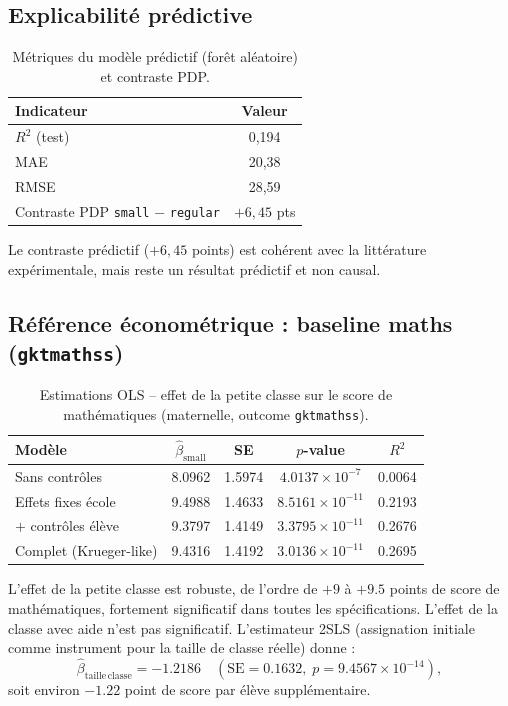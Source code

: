 \documentclass[11pt,a4paper]{article}
\begin{document}
\subsection{Explicabilité prédictive}

\begin{table}[H]
\centering
\caption{Métriques du modèle prédictif (forêt aléatoire) et contraste PDP.}
\label{tab:rf}
\begin{tabular}{lc}
\toprule
Indicateur & Valeur \\
\midrule
$R^2$ (test) & 0{,}194 \\
MAE & 20{,}38 \\
RMSE & 28{,}59 \\
Contraste PDP \texttt{small} $-$ \texttt{regular} & $+6{,}45$ pts \\
\bottomrule
\end{tabular}
\end{table}

Le contraste prédictif ($+6{,}45$ points) est cohérent avec la littérature expérimentale, mais reste un résultat prédictif et non causal.

\subsection{Référence économétrique : baseline maths (\texttt{gktmathss})}

\begin{table}[H]
\centering
\caption{Estimations OLS -- effet de la petite classe sur le score de mathématiques (maternelle, outcome \texttt{gktmathss}).}
\label{tab:ols}
\begin{tabular}{lcccc}
\toprule
Modèle & $\hat\beta_{\mathrm{small}}$ & SE & $p$-value & $R^2$ \\
\midrule
Sans contrôles & 8.0962 & 1.5974 & $4.0137\times10^{-7}$ & 0.0064 \\
Effets fixes école & 9.4988 & 1.4633 & $8.5161\times10^{-11}$ & 0.2193 \\
$+$ contrôles élève & 9.3797 & 1.4149 & $3.3795\times10^{-11}$ & 0.2676 \\
Complet (Krueger-like) & 9.4316 & 1.4192 & $3.0136\times10^{-11}$ & 0.2695 \\
\bottomrule
\end{tabular}
\end{table}

L'effet de la petite classe est robuste, de l'ordre de $+9$ à $+9.5$ points de score de mathématiques, fortement significatif dans toutes les spécifications. L'effet de la classe avec aide n'est pas significatif. L'estimateur 2SLS (assignation initiale comme instrument pour la taille de classe réelle) donne :
\[
\hat\beta_{\mathrm{taille\,classe}} = -1.2186 \quad (\mathrm{SE}=0.1632,\; p = 9.4567\times10^{-14}),
\]
soit environ $-1.22$ point de score par élève supplémentaire.
\end{document}
